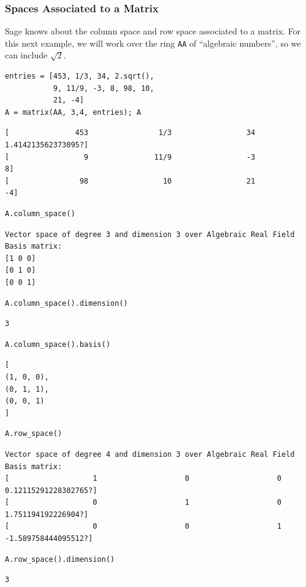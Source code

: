 \documentclass[10pt,]{book}
\theoremstyle{plain}
\theoremstyle{definition}
\numberwithin{equation}{section}
\begin{document}
      \typeout{************************************************}
\typeout{************************************************}
\subsubsection[Spaces Associated to a Matrix]{Spaces Associated to a Matrix}\label{subsubsection-43}

        Sage knows about the column space and row space associated to a
        matrix. For this next example, we will work over the ring \verb?AA?
        of ``algebraic numbers'', so we can include \(\sqrt{2}\).
\begin{lstlisting}[style=sageinput]
entries = [453, 1/3, 34, 2.sqrt(),
           9, 11/9, -3, 8, 98, 10,
           21, -4]
A = matrix(AA, 3,4, entries); A
\end{lstlisting}
\begin{lstlisting}[style=sageoutput]
[               453                1/3                 34 1.414213562373095?]
[                 9               11/9                 -3                  8]
[                98                 10                 21                 -4]
\end{lstlisting}
\begin{lstlisting}[style=sageinput]
A.column_space()
\end{lstlisting}
\begin{lstlisting}[style=sageoutput]
Vector space of degree 3 and dimension 3 over Algebraic Real Field
Basis matrix:
[1 0 0]
[0 1 0]
[0 0 1]
\end{lstlisting}
\begin{lstlisting}[style=sageinput]
A.column_space().dimension()
\end{lstlisting}
\begin{lstlisting}[style=sageoutput]
3
\end{lstlisting}
\begin{lstlisting}[style=sageinput]
A.column_space().basis()
\end{lstlisting}
\begin{lstlisting}[style=sageoutput]
[
(1, 0, 0),
(0, 1, 1),
(0, 0, 1)
]
\end{lstlisting}
\begin{lstlisting}[style=sageinput]
A.row_space()
\end{lstlisting}
\begin{lstlisting}[style=sageoutput]
Vector space of degree 4 and dimension 3 over Algebraic Real Field
Basis matrix:
[                   1                    0                    0 0.12115291228302765?]
[                   0                    1                    0   1.751194192226904?]
[                   0                    0                    1  -1.589758444095512?]
\end{lstlisting}
\begin{lstlisting}[style=sageinput]
A.row_space().dimension()
\end{lstlisting}
\begin{lstlisting}[style=sageoutput]
3
\end{lstlisting}
\par
\end{document}
